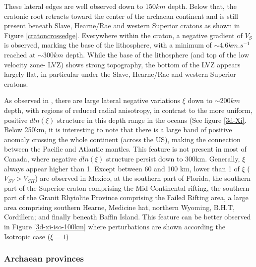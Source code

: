 \documentclass[12pt]{article}
\begin{document}
		These lateral edges are well observed down to $150km$ depth. 
		Below that, the cratonic root retracts toward the center of the archaean continent and is still present beneath Slave, Hearne/Rae and western Superior cratons as shown in Figure \ref{cratoncrossedge}. 
		Everywhere within the craton, a negative gradient of $V_S$ is observed, marking the base of the lithosphere, with a minimum of $\sim 4.6km.s^{-1}$ reached at $\sim 300km$ depth. 
		While the base of the lithosphere (and top of the low velocity zone- LVZ) shows strong topography, the bottom of the LVZ appears largely flat, in particular under the  Slave, Hearne/Rae and western Superior cratons.

		As observed in \cite{babuvska1998age,gung2003global,yuan2014lithospheric}, there are large lateral negative variations $\xi$ down to $\sim 200km$ depth, with regions of reduced radial anisotropy, in contrast to the more uniform, positive $dln(\xi)$ structure in this depth range in the oceans (See figure \ref{3d-Xi}. 
		Below 250km, it is interesting to note that there is a large band of positive anomaly crossing the whole continent (across the US), making the connection between the Pacific and Atlantic mantles. 
		This feature is not present in most of Canada, where negative $dln(\xi)$ structure persist down to 300km.
		Generally, $\xi$ always appear higher than 1. 
		Except between 60 and 100 km, lower than 1 of $\xi$ ($V_{SV} > V_{SH}$) are observed in Mexico, at the southern part of Florida, the southern part of the Superior craton comprising the Mid Continental rifting, the southern part of the Granit Rhyiolite Province comprising the Failed Rifting area, a large area comprising southern Hearne, Medicine hat, northern Wyoming, B.H.T, Cordillera; and finally beneath Baffin Island. This feature can be better observed in Figure \ref{3d-xi-iso-100km} where perturbations are shown according the Isotropic case ($\xi = 1$)


	\subsubsection{Archaean provinces}
\end{document}
